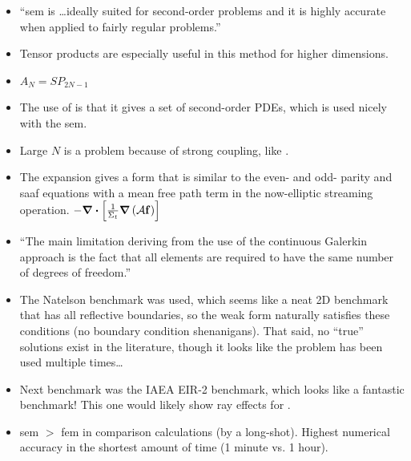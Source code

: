\begin{itemize}
  \item ``\gls{sem} is \dots ideally suited for second-order problems and it is highly accurate when applied to fairly regular problems.''
  \item Tensor products are especially useful in this method for higher dimensions.
  \item $A_N=SP_{2N-1}$
  \item The use of \An is that it gives a set of second-order PDEs, which is used nicely with the \gls{sem}.
  \item Large $N$ is a problem because of strong coupling, like \Pn.
  \item The \An expansion gives a form that is similar to the even- and odd- parity and \gls{saaf} equations with a mean free path term in the now-elliptic streaming operation. $-\divergence \left[\frac{1}{\Sigma_t}\grad\left(\mathcal{A}\mathbf{f}\right)\right]$
  \item ``The main limitation deriving from the use of the continuous Galerkin approach is the fact that all elements are required to have the same number of degrees of freedom.''
  \item The Natelson benchmark was used, which seems like a neat 2D benchmark that has all reflective boundaries, so the weak form naturally satisfies these conditions (no boundary condition shenanigans). That said, no ``true'' solutions exist in the literature, though it looks like the problem has been used multiple times\dots
  \item Next benchmark was the IAEA EIR-2 benchmark, which looks like a fantastic benchmark! This one would likely show ray effects for \Sn.
  \item \gls{sem} $>$ \gls{fem} in comparison calculations (by a long-shot). Highest numerical accuracy in the shortest amount of time (1 minute vs. 1 hour).
\end{itemize}